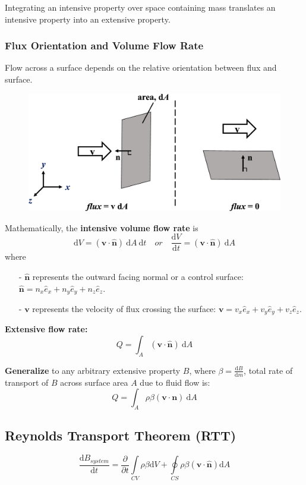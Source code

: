 \documentclass[12pt, a4paper]{article}
\begin{document}
Integrating an intensive property over space containing mass translates an intensive property into an extensive property.


\subsubsection{Flux Orientation and Volume Flow Rate}
Flow across a surface depends on the relative orientation between flux and surface.
\begin{figure}[H]
    \centering
    \includegraphics[width=.7\textwidth]{img/flux_orientation.eps}
\end{figure}
Mathematically, the \textbf{intensive volume flow rate} is
\[ 
    \mathrm{d}V=(\bm{v} \cdot \bm{\hat{n}}) \ \mathrm{d}A \ \mathrm{d}t \quad or \quad \frac{\mathrm{d}V}{\mathrm{d}t}=(\bm{v} \cdot \bm{\hat{n}}) \ \mathrm{d}A 
\]
where
\begin{itemize}
    \item[-] $\bm{\hat{n}}$ represents the outward facing normal or a control surface: $\bm{\hat{n}}=n_{x}\hat{e}_{x}+n_{y}\hat{e}_{y}+n_{z}\hat{e}_{z}$.
    \item[-] $\bm{v}$ represents the velocity of flux crossing the surface: $\bm{v}=v_{x}\hat{e}_{x}+v_{y}\hat{e}_{y}+v_{z}\hat{e}_{z}$.
\end{itemize}

\textbf{Extensive flow rate:}
\[ 
    Q = \int_{A} (\bm{v} \cdot \bm{\hat{n}}) \ \mathrm{d}A 
\]


\textbf{Generalize} to any arbitrary extensive property $B$, where $\beta = \frac{\mathrm{d}B}{\mathrm{d}m}$, total rate of transport of $B$ across surface area $A$ due to fluid flow is:
\[
    Q =  \int_{A} \rho \beta (\bm{v} \cdot \bm{n}) \ \mathrm{d}A 
\]

\subsection{Reynolds Transport Theorem (RTT)}
\begin{equation}
\label{eqn:RTT}
    \frac{\mathrm{d}B_{system}}{\mathrm{d}t} 
    = \frac{\partial}{\partial t} \int\limits_{CV} \rho \beta \mathrm{d}V 
    + \oint\limits_{CS} \rho \beta (\bm{v} \cdot \bm{\hat{n}})\mathrm{d}A 
\end{equation}
\end{document}
